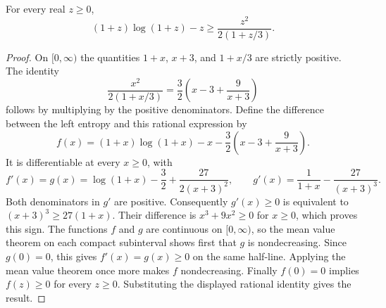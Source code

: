 \begin{helper}
For every real $z\ge0$,
\[
 (1+z)\log(1+z)-z\ge\frac{z^2}{2(1+z/3)}.
\]
\end{helper}
\begin{proof}
On $[0,\infty)$ the quantities $1+x$, $x+3$, and $1+x/3$ are
strictly positive. The identity
\[
 \frac{x^2}{2(1+x/3)}=\frac32\left(x-3+\frac9{x+3}\right)
\]
follows by multiplying by the positive denominators. Define the
difference between the left entropy and this rational expression by
\[
 f(x)=(1+x)\log(1+x)-x-\frac32\left(x-3+\frac9{x+3}\right).
\]
It is differentiable at every $x\ge0$, with
\[
 f'(x)=g(x)=\log(1+x)-\frac32+\frac{27}{2(x+3)^2},\qquad
 g'(x)=\frac1{1+x}-\frac{27}{(x+3)^3}.
\]
Both denominators in $g'$ are positive. Consequently $g'(x)\ge0$
is equivalent to $(x+3)^3\ge27(1+x)$. Their difference is
$x^3+9x^2\ge0$ for $x\ge0$, which proves this sign. The functions
$f$ and $g$ are continuous on $[0,\infty)$, so the mean value theorem
on each compact subinterval shows first that $g$ is nondecreasing.
Since $g(0)=0$, this gives $f'(x)=g(x)\ge0$ on the same half-line.
Applying the mean value theorem once more makes $f$ nondecreasing.
Finally $f(0)=0$ implies $f(z)\ge0$ for every $z\ge0$. Substituting
the displayed rational identity gives the result.
\end{proof}
